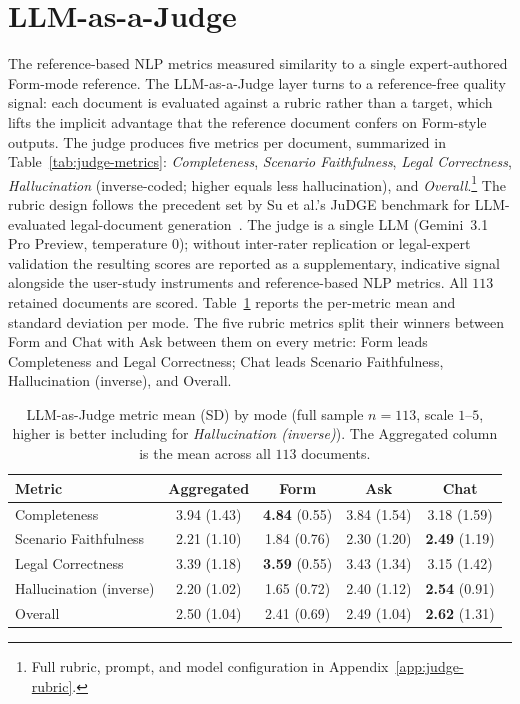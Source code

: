\bigskip
\bigskip
\bigskip
\bigskip
\bigskip

\section{LLM-as-a-Judge}
\label{sec:eval-judge}

The reference-based NLP metrics measured similarity to a single
expert-authored Form-mode reference. The LLM-as-a-Judge layer
turns to a reference-free quality signal: each document is
evaluated against a rubric rather than a target, which lifts the
implicit advantage that the reference document confers on
Form-style outputs. The judge produces five metrics per document,
summarized in Table~\ref{tab:judge-metrics}: \emph{Completeness},
\emph{Scenario Faithfulness}, \emph{Legal Correctness},
\emph{Hallucination} (inverse-coded; higher equals less
hallucination), and \emph{Overall}.\footnote{Full rubric, prompt,
and model configuration in Appendix~\ref{app:judge-rubric}.}
The rubric design follows the precedent set by Su et al.'s JuDGE
benchmark for LLM-evaluated legal-document
generation~\cite{suJuDGEBenchmarkingJudgment2025}. The judge is a
single LLM (Gemini~3.1 Pro Preview, temperature $0$); without
inter-rater replication or legal-expert validation the resulting
scores are reported as a supplementary, indicative signal
alongside the user-study instruments and reference-based NLP
metrics. All $113$ retained documents are scored.
Table~\ref{tab:judge-summary} reports the per-metric mean and
standard deviation per mode. The five rubric metrics split their
winners between Form and Chat with Ask between them on every
metric: Form leads Completeness and Legal Correctness; Chat leads
Scenario Faithfulness, Hallucination (inverse), and Overall.

\begin{table}[htbp]
\centering
\begin{tabular}{@{}l c c c c@{}}
\toprule
Metric & Aggregated & Form & Ask & Chat \\
\midrule
Completeness            & 3.94 (1.43) & \textbf{4.84} (0.55) & 3.84 (1.54) & 3.18 (1.59) \\
Scenario Faithfulness   & 2.21 (1.10) & 1.84 (0.76) & 2.30 (1.20) & \textbf{2.49} (1.19) \\
Legal Correctness       & 3.39 (1.18) & \textbf{3.59} (0.55) & 3.43 (1.34) & 3.15 (1.42) \\
Hallucination (inverse) & 2.20 (1.02) & 1.65 (0.72) & 2.40 (1.12) & \textbf{2.54} (0.91) \\
Overall                 & 2.50 (1.04) & 2.41 (0.69) & 2.49 (1.04) & \textbf{2.62} (1.31) \\
\bottomrule
\end{tabular}
\caption{LLM-as-Judge metric mean (SD) by mode (full sample
$n = 113$, scale $1$--$5$, higher is better including for
\emph{Hallucination (inverse)}). The Aggregated column is the
mean across all $113$ documents.}
\label{tab:judge-summary}
\end{table}

